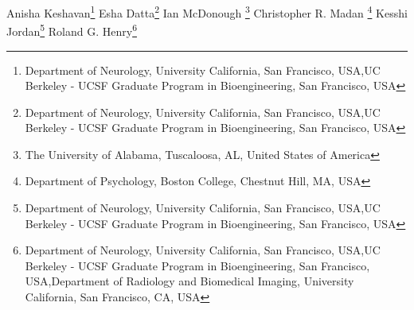 \iflatexml
Anisha Keshavan\footnote[1,2]{Department of Neurology, University California, San Francisco,  USA,UC Berkeley - UCSF Graduate Program in Bioengineering, San Francisco, USA}
Esha Datta\footnote[1,2]{Department of Neurology, University California, San Francisco,  USA,UC Berkeley - UCSF Graduate Program in Bioengineering, San Francisco, USA}
Ian McDonough \footnote[3] {The University of Alabama, Tuscaloosa, AL, United States of America}
Christopher R. Madan \footnote[4]{Department of Psychology, Boston College, Chestnut Hill, MA, USA}
Kesshi Jordan\footnote[1,2]{Department of Neurology, University California, San Francisco,  USA,UC Berkeley - UCSF Graduate Program in Bioengineering, San Francisco, USA}
Roland G. Henry\footnote[1,2,5]{Department of Neurology, University California, San Francisco,  USA,UC Berkeley - UCSF Graduate Program in Bioengineering, San Francisco, USA,Department of Radiology and Biomedical Imaging, University California, San Francisco, CA, USA}

\else %

\author[l1,l2]{Anisha Keshavan}

\author[l1,l2]{Esha Datta}

\author[3]{Ian McDonough}

\author[4]{Christopher R. Madan}

\author[l1,l2]{Kesshi Jordan}

\author[l1,l2,5]{Roland G. Henry}

\address[l1]{Department of Neurology, University California, San Francisco,  USA}
\address[l2]{UC Berkeley - UCSF Graduate Program in Bioengineering, San Francisco, USA}
\address[3]{The University of Alabama, Tuscaloosa, AL, United States of America}
\address[4]{Department of Psychology, Boston College, Chestnut Hill, MA, USA}
\address[5]{Department of Radiology and Biomedical Imaging, University California, San Francisco, CA, USA}

\fi
